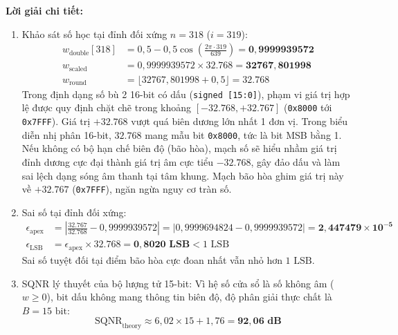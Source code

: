 \textbf{Lời giải chi tiết:}
\begin{enumerate}[label=(\alph*)]
    \item Khảo sát số học tại đỉnh đối xứng $n = 318$ ($i = 319$):
    \begin{align}
    w_{\text{double}}[318] &= 0{,}5 - 0{,}5 \cos\left( \frac{2\pi \cdot 319}{639} \right) = \mathbf{0{,}9999939572} \nonumber \\
    w_{\text{scaled}} &= 0{,}9999939572 \times 32.768 = \mathbf{32767{,}801998} \nonumber \\
    w_{\text{round}} &= \lfloor 32767{,}801998 + 0{,}5 \rfloor = \mathbf{32.768}
    \end{align}
    Trong định dạng số bù 2 16-bit có dấu (\texttt{signed [15:0]}), phạm vi giá trị hợp lệ được quy định chặt chẽ trong khoảng $[-32.768, +32.767]$ (\texttt{0x8000} tới \texttt{0x7FFF}). 
    Giá trị $+32.768$ vượt quá biên dương lớn nhất 1 đơn vị. Trong biểu diễn nhị phân 16-bit, $32.768$ mang mẫu bit \texttt{0x8000}, tức là bit MSB bằng 1. Nếu không có bộ hạn chế biên độ (bão hòa), mạch số sẽ hiểu nhầm giá trị đỉnh dương cực đại thành giá trị âm cực tiểu $\mathbf{-32.768}$, gây đảo dấu và làm sai lệch dạng sóng âm thanh tại tâm khung. Mạch bão hòa ghim giá trị này về $+32.767$ (\texttt{0x7FFF}), ngăn ngừa nguy cơ tràn số.

    \item Sai số tại đỉnh đối xứng:
    \begin{align}
    \epsilon_{\text{apex}} &= \left| \frac{32.767}{32.768} - 0{,}9999939572 \right| = \left| 0{,}9999694824 - 0{,}9999939572 \right| = \mathbf{2{,}447479 \times 10^{-5}} \\
    \epsilon_{\text{LSB}} &= \epsilon_{\text{apex}} \times 32.768 = \mathbf{0{,}8020\text{ LSB}} < 1\text{ LSB}
    \end{align}
    Sai số tuyệt đối tại điểm bão hòa cực đoan nhất vẫn nhỏ hơn $1\text{ LSB}$.

    \item SQNR lý thuyết của bộ lượng tử 15-bit:
    Vì hệ số cửa sổ là số không âm ($w \ge 0$), bit dấu không mang thông tin biên độ, độ phân giải thực chất là $B = 15\text{ bit}$:
    \begin{equation}
    \text{SQNR}_{\text{theory}} \approx 6{,}02 \times 15 + 1{,}76 = \mathbf{92{,}06\text{ dB}}
    \end{equation}


\end{enumerate}
